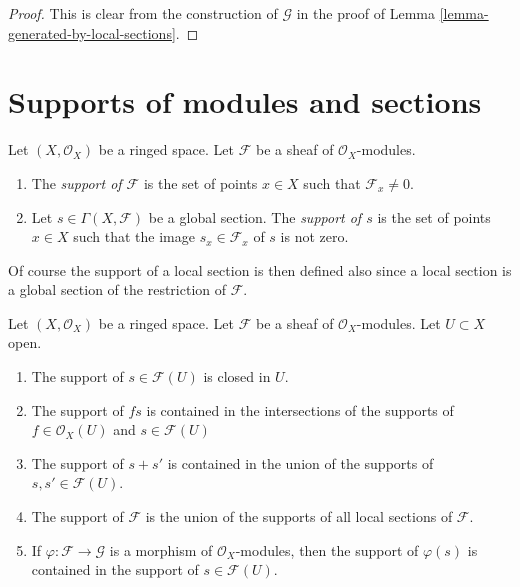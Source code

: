 \begin{proof}
This is clear from the construction of $\mathcal{G}$
in the proof of Lemma \ref{lemma-generated-by-local-sections}.
\end{proof}










\section{Supports of modules and sections}
\label{section-support}

\begin{definition}
\label{definition-support}
Let $(X, \mathcal{O}_X)$ be a ringed space.
Let $\mathcal{F}$ be a sheaf of $\mathcal{O}_X$-modules.
\begin{enumerate}
\item The {\it support of $\mathcal{F}$} is the set of
points $x \in X$ such that $\mathcal{F}_x \not = 0$.
\item Let $s \in \Gamma(X, \mathcal{F})$ be a global section.
The {\it support of $s$} is the set of points $x \in X$
such that the image $s_x \in \mathcal{F}_x$ of $s$ is
not zero.
\end{enumerate}
\end{definition}

\noindent
Of course the support of a local section is then defined also
since a local section is a global section of the restriction of
$\mathcal{F}$.

\begin{lemma}
\label{lemma-support-section-closed}
Let $(X, \mathcal{O}_X)$ be a ringed space.
Let $\mathcal{F}$ be a sheaf of $\mathcal{O}_X$-modules.
Let $U \subset X$ open.
\begin{enumerate}
\item The support of $s \in \mathcal{F}(U)$ is closed in $U$.
\item The support of $fs$ is contained in the intersections
of the supports of $f \in \mathcal{O}_X(U)$ and $s \in \mathcal{F}(U)$
\item The support of $s + s'$ is contained in the union of
the supports of $s, s' \in \mathcal{F}(U)$.
\item The support of $\mathcal{F}$ is the union of the supports
of all local sections of $\mathcal{F}$.
\item If $\varphi : \mathcal{F} \to \mathcal{G}$ is a morphism of
$\mathcal{O}_X$-modules, then the support of $\varphi(s)$ is
contained in the support of $s \in \mathcal{F}(U)$.
\end{enumerate}
\end{lemma}

